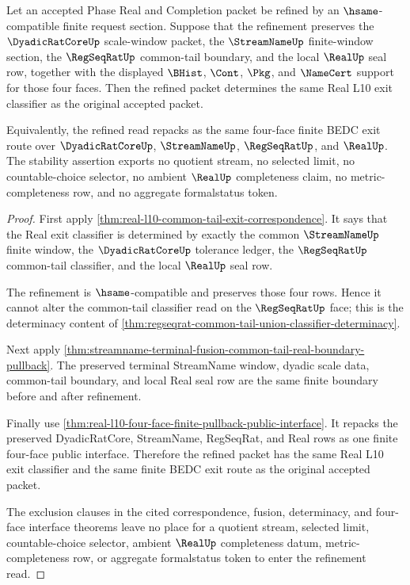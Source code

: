 \begin{theorem}
\label{thm:real-l10-exit-refinement-stability}
Let an accepted Phase Real and Completion packet be refined by an
$\hsame$-compatible finite request section. Suppose that the refinement
preserves the $\DyadicRatCoreUp$ scale-window packet, the $\StreamNameUp$
finite-window section, the $\RegSeqRatUp$ common-tail boundary, and the local
$\RealUp$ seal row, together with the displayed $\BHist$, $\Cont$, $\Pkg$,
and $\NameCert$ support for those four faces. Then the refined packet
determines the same Real L10 exit classifier as the original accepted packet.

Equivalently, the refined read repacks as the same four-face finite BEDC exit
route over $\DyadicRatCoreUp$, $\StreamNameUp$, $\RegSeqRatUp$, and
$\RealUp$. The stability assertion exports no quotient stream, no selected
limit, no countable-choice selector, no ambient $\RealUp$ completeness claim,
no metric-completeness row, and no aggregate formalstatus token.
\end{theorem}
\begin{proof}
First apply \autoref{thm:real-l10-common-tail-exit-correspondence}. It says
that the Real exit classifier is determined by exactly the common
$\StreamNameUp$ finite window, the $\DyadicRatCoreUp$ tolerance ledger, the
$\RegSeqRatUp$ common-tail classifier, and the local $\RealUp$ seal row.

The refinement is $\hsame$-compatible and preserves those four rows. Hence it
cannot alter the common-tail classifier read on the $\RegSeqRatUp$ face; this
is the determinacy content of
\autoref{thm:regseqrat-common-tail-union-classifier-determinacy}.

Next apply
\autoref{thm:streamname-terminal-fusion-common-tail-real-boundary-pullback}.
The preserved terminal StreamName window, dyadic scale data, common-tail
boundary, and local Real seal row are the same finite boundary before and
after refinement.

Finally use \autoref{thm:real-l10-four-face-finite-pullback-public-interface}.
It repacks the preserved DyadicRatCore, StreamName, RegSeqRat, and Real rows
as one finite four-face public interface. Therefore the refined packet has the
same Real L10 exit classifier and the same finite BEDC exit route as the
original accepted packet.

The exclusion clauses in the cited correspondence, fusion, determinacy, and
four-face interface theorems leave no place for a quotient stream, selected
limit, countable-choice selector, ambient $\RealUp$ completeness datum,
metric-completeness row, or aggregate formalstatus token to enter the
refinement read.
\end{proof}

